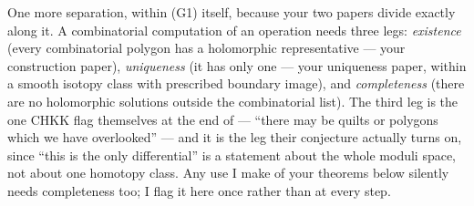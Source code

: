 \documentclass[11pt,reqno]{amsart}
\theoremstyle{plain}
\theoremstyle{definition}
\begin{document}
One more separation, within (G1) itself, because your two papers divide exactly along it. A
combinatorial computation of an operation needs three legs: \emph{existence} (every
combinatorial polygon has a holomorphic representative --- your construction paper),
\emph{uniqueness} (it has only one --- your uniqueness paper, within a smooth isotopy class
with prescribed boundary image), and \emph{completeness} (there are no holomorphic solutions
outside the combinatorial list). The third leg is the one CHKK flag themselves at the end of
\cite[\S10.4]{CHKK} --- ``there may be quilts or polygons which we have overlooked'' --- and it is the leg
their conjecture actually turns on, since ``this is the only differential'' is a statement
about the whole moduli space, not about one homotopy class. Any use I make of your theorems
below silently needs completeness too; I flag it here once rather than at every step.
\end{document}
